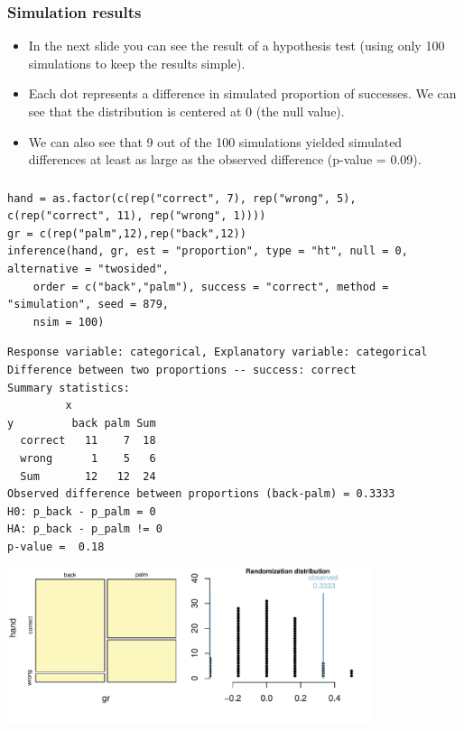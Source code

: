 
\begin{frame}
\frametitle{Simulation results}

\begin{itemize}

\item In the next slide you can see the result of a hypothesis test (using only 100 simulations to keep the results simple).

\item Each dot represents a difference in simulated proportion of successes. We can see that the distribution is centered at 0 (the null value).

\item We can also see that 9 out of the 100 simulations yielded simulated differences at least as large as the observed difference (p-value = 0.09).

\end{itemize}

\end{frame}


\begin{frame}[fragile]
\frametitle{}

{\tiny
\begin{Verbatim}[frame=single, formatcom=\color{blue}]
hand = as.factor(c(rep("correct", 7), rep("wrong", 5), c(rep("correct", 11), rep("wrong", 1))))
gr = c(rep("palm",12),rep("back",12))
inference(hand, gr, est = "proportion", type = "ht", null = 0, alternative = "twosided",
	order = c("back","palm"), success = "correct", method = "simulation", seed = 879,
	nsim = 100)
\end{Verbatim}
}

\pause

{\tiny
\begin{Verbatim}[frame=single, formatcom=\color{gray}]
Response variable: categorical, Explanatory variable: categorical
Difference between two proportions -- success: correct
Summary statistics:
         x
y         back palm Sum
  correct   11    7  18
  wrong      1    5   6
  Sum       12   12  24
Observed difference between proportions (back-palm) = 0.3333
H0: p_back - p_palm = 0 
HA: p_back - p_palm != 0 
p-value =  0.18 
\end{Verbatim}
}

\includegraphics[width=0.8\textwidth,height=0.3\textheight]{6-6_small_two_props/figures/hand/palm_back_HT}

\end{frame}

